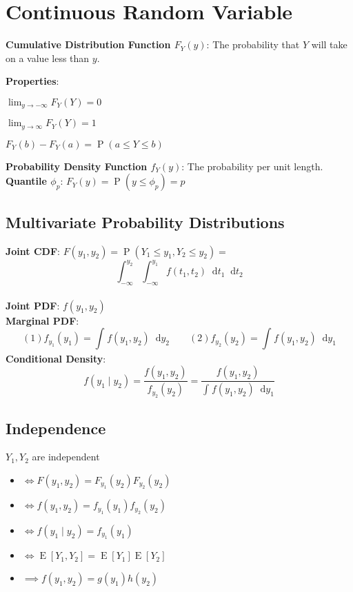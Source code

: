 \documentclass[12pt]{article}
\newcommand{\defn}[1]{\textbf{#1}:}
\newcommand{\pr}[1]{\operatorname{P}(#1)}
\newcommand{\expt}[1]{\operatorname{E}[#1]}
\newcommand*\diff{\mathop{}\!\mathrm{d}}
\newcommand{\intv}[4]{\int_{#3}^{#4} #1 \diff #2}
\begin{document}
\section{Continuous Random Variable}

\defn{Cumulative Distribution Function $F_Y(y)$} The probability that $Y$ will take on a value less than $y$.

\defn{Properties}
\begin{itemize*}
    \item $\lim_{y\to-\infty}F_{Y}(Y) = 0$
    \item $\lim_{y\to\infty}F_{Y}(Y) = 1$
    \item $F_{Y}(b) - F_{Y}(a) = \pr{a \leq Y \leq b}$
\end{itemize*}

\defn{Probability Density Function $f_Y(y)$} The probability per unit length.\\
\defn{Quantile $\phi_{p}$} $F_{Y}(y) = \pr{y \leq \phi_{p}} = p$ 

\subsection{Multivariate Probability Distributions}
\defn{Joint CDF} $F(y_1, y_2) = \pr{Y_1 \leq y_1, Y_2 \leq y_2} = $ \[
    \intv{ \intv{ f(t_1, t_2) }{t_1}{-\infty}{y_1} }{t_2}{-\infty}{y_2}
\]\\
\defn{Joint PDF} $f(y_1, y_2)$\\
\defn{Marginal PDF} \[
    (1) f_{y_1}(y_1) = \intv{ f(y_1, y_2) }{y_2}{}{}
    \qquad
    (2) f_{y_2}(y_2) = \intv{ f(y_1, y_2) }{y_1}{}{}
\]
\defn{Conditional Density} \[
    f(y_1 \mid y_2)
    = \frac{f(y_1, y_2)}{f_{y_2}(y_2)} 
    = \frac{f(y_1, y_2)}{\intv{ f(y_1, y_2) }{y_1}{}{}}
\]
\subsection{Independence}
$Y_1, Y_2$ are independent
\begin{itemize}
    \item $\iff F(y_1, y_2) = F_{y_1}(y_2)F_{y_2}(y_2)$
    \item $\iff f(y_1, y_2) = f_{y_1}(y_1)f_{y_2}(y_2)$
    \item $\iff f(y_1 \mid y_2) = f_{y_1}(y_1)$
    \item $\iff \expt{Y_1, Y_2} = \expt{Y_1}\expt{Y_2}$
    \item $\implies f(y_1, y_2) = g(y_1)h(y_2)$
\end{itemize}
\end{document}

